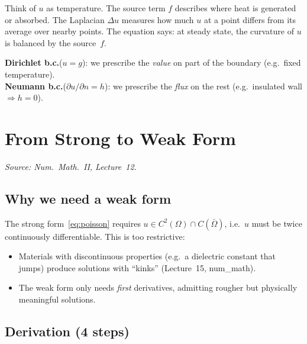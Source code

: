 \documentclass[11pt,a4paper]{article}
\theoremstyle{plain}
\theoremstyle{remark}
\let\origsubsection\subsection
\renewcommand{\subsection}{\needspace{6\baselineskip}\origsubsection}
\begin{document}
\begin{intuition}
Think of $u$ as temperature.
The source term $f$ describes where heat is generated or absorbed.
The Laplacian $\Delta u$ measures how much $u$ at a point differs from
its average over nearby points.
The equation says: at steady state, the curvature of $u$ is balanced
by the source~$f$.

\medskip
\textbf{Dirichlet b.c.}\;($u = g$): we prescribe the \emph{value} on
part of the boundary (e.g.\ fixed temperature).\\[2pt]
\textbf{Neumann b.c.}\;($\partial u/\partial n = h$): we prescribe the
\emph{flux} on the rest (e.g.\ insulated wall $\Rightarrow h=0$).
\end{intuition}

\newpage
\section{From Strong to Weak Form}
\label{sec:weak}

\textit{Source: Num.\ Math.\ II, Lecture~12.}

\subsection{Why we need a weak form}

The strong form~\eqref{eq:poisson} requires
$u \in C^2(\Omega) \cap C(\bar{\Omega})$, i.e.\ $u$ must be twice
continuously differentiable.  This is too restrictive:
\begin{itemize}[nosep]
  \item Materials with discontinuous properties (e.g.\ a dielectric
        constant that jumps) produce solutions with ``kinks''
        (Lecture~15, num\_math).
  \item The weak form only needs \emph{first} derivatives, admitting
        rougher but physically meaningful solutions.
\end{itemize}

\subsection{Derivation (4 steps)}
\end{document}
